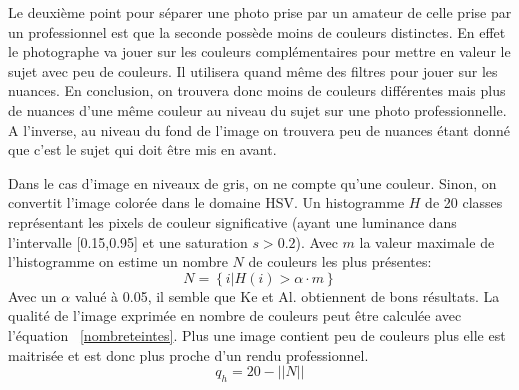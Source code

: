 \documentclass[11pt, french,screen]{report-rd-info}
\begin{document}
\begin{description}
Le deuxième point pour séparer une photo prise par un amateur de celle prise par un professionnel est que la seconde possède moins de couleurs distinctes. En effet le photographe va jouer sur les couleurs complémentaires pour mettre en valeur le sujet avec peu de couleurs. Il utilisera quand même des filtres pour jouer sur les nuances. En conclusion, on trouvera donc moins de couleurs différentes mais plus de nuances d’une même couleur au niveau du sujet sur une photo professionnelle. A l’inverse, au niveau du fond de l’image on trouvera peu de nuances étant donné que c’est le sujet qui doit être mis en avant.

Dans le cas d'image en niveaux de gris, on ne compte qu'une couleur. Sinon, on convertit l'image colorée dans le domaine HSV. Un histogramme $H$ de 20 classes représentant les pixels de couleur significative (ayant une luminance dans l'intervalle [0.15,0.95] et une saturation $s > 0.2$). Avec $m$ la valeur maximale de l'histogramme on estime un nombre $N$ de couleurs les plus présentes: 
\begin{equation}
N = \left\{i|H(i)>\alpha \cdot m\right\}
\end{equation}
Avec un $\alpha$ valué à 0.05, il semble que Ke et Al. obtiennent de bons résultats. La qualité de l'image exprimée en nombre de couleurs peut être calculée avec l'équation ~\ref{nombreteintes}. Plus une image contient peu de couleurs plus elle est maitrisée et est donc plus proche d'un rendu professionnel. 
\begin{equation}
q_h = 20 - ||N||
\label{nombreteintes}
\end{equation}


\end{description}
\end{document}

